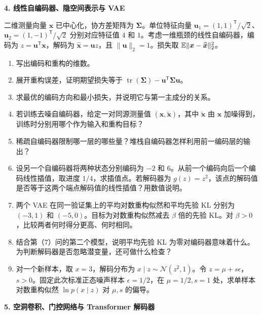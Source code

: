 \noindent\textbf{4. 线性自编码器、隐空间表示与 VAE}

二维测量向量 $\bm{x}$ 已中心化，协方差矩阵为 $\bm{\Sigma}$。单位特征向量 $\bm{u}_1=(1,1)^{\mathsf T}/\sqrt2$、$\bm{u}_2=(1,-1)^{\mathsf T}/\sqrt2$ 分别对应特征值 $4$ 和 $1$。考虑一维瓶颈的线性自编码器，编码为 $z=\bm{u}^{\mathsf T}\bm{x}$，解码为 $\widehat{\bm{x}}=\bm{u}z$，且 $\|\bm{u}\|_2=1$。损失取 $\mathbb{E}\|\bm{x}-\widehat{\bm{x}}\|_2^2$。

\begin{enumerate}[label=(\arabic*)]
\item 写出编码和重构的维数。
\item 展开重构误差，证明期望损失等于 $\operatorname{tr}(\bm{\Sigma})-\bm{u}^{\mathsf T}\bm{\Sigma}\bm{u}$。
\item 求最优的编码方向和最小损失，并说明它与第一主成分的关系。
\item 若训练去噪自编码器，给定一对同源测量值 $(\bm{x},\widetilde{\bm{x}})$，其中 $\widetilde{\bm{x}}$ 由 $\bm{x}$ 加噪得到，训练时分别用哪个作为输入和重构目标？
\item 稀疏自编码器限制哪一层的哪些量？堆栈自编码器怎样利用前一编码层的输出？
\item 设另一个自编码器将两种状态分别编码为 $-2$ 和 $6$。从前一个编码向后一个编码线性插值，取进度 $1/4$，求插值点。若解码器为 $g(z)=z^2$，该点的解码值是否等于这两个端点解码值的线性插值？用数值说明。
\item 两个 VAE 在同一验证集上的平均对数重构似然和平均先验 KL 分别为 $(-3,1)$ 和 $(-5,0)$。目标为对数重构似然减去 $\beta$ 倍的先验 KL。对 $\beta>0$，比较两者何时得分更高、何时相同。
\item 结合第（7）问的第二个模型，说明平均先验 KL 为零对编码器意味着什么。为判断解码器是否忽略潜变量，还可做什么检查？
\item 对一个新样本，取 $x=3$，解码分布为 $x\mid z\sim\mathcal N(z^2,1)$。令 $z=\mu+s\epsilon$，$s>0$。固定此次标准正态噪声样本 $\epsilon=1/2$，在 $\mu=1/2,s=1$ 处，求单样本对数重构似然 $\ln p(x\mid z)$ 对 $\mu,s$ 的偏导。
\end{enumerate}

\noindent\textbf{5. 空洞卷积、门控网络与 Transformer 解码器}

